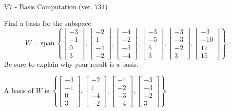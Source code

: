 \begin{exercise}
  \begin{exerciseTitle}V7 - Basis Computation (ver. 734)\end{exerciseTitle}
  \begin{exerciseStatement}
    Find a basis for the subspace 
\[W=\mathrm{span}\ \left\{\left[\begin{array}{r}
-3 \\
-1 \\
0 \\
3
\end{array}\right] , \left[\begin{array}{r}
-2 \\
1 \\
-4 \\
-2
\end{array}\right] , \left[\begin{array}{r}
-4 \\
-2 \\
-3 \\
-4
\end{array}\right] , \left[\begin{array}{r}
-3 \\
-5 \\
5 \\
3
\end{array}\right] , \left[\begin{array}{r}
-3 \\
-3 \\
-2 \\
3
\end{array}\right] , \left[\begin{array}{r}
-3 \\
-10 \\
17 \\
15
\end{array}\right]\right\}.\]
 Be sure to explain why your result is a basis.


  \end{exerciseStatement}
  \begin{exerciseAnswer}
   A basis of \(W\) is  \(\left\{\left[\begin{array}{r}
-3 \\
-1 \\
0 \\
3
\end{array}\right] , \left[\begin{array}{r}
-2 \\
1 \\
-4 \\
-2
\end{array}\right] , \left[\begin{array}{r}
-4 \\
-2 \\
-3 \\
-4
\end{array}\right] , \left[\begin{array}{r}
-3 \\
-3 \\
-2 \\
3
\end{array}\right]\right\}\).
  


  \end{exerciseAnswer}
\end{exercise}